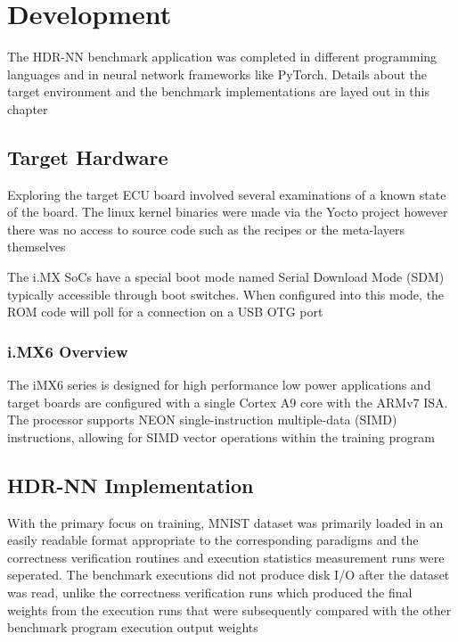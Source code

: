 
\chapter{Development}

The HDR-NN benchmark application was completed in different programming languages and in neural network frameworks like PyTorch. Details about the target environment and the benchmark implementations are layed out in this chapter

\section[iMX6 Custom Board Target]{Target Hardware}

Exploring the target ECU board involved several examinations of a known state of the board. The linux kernel binaries were made via the Yocto project however there was no access to source code such as the recipes or the meta-layers themselves

The i.MX SoCs have a special boot mode named Serial Download Mode (SDM) typically accessible through boot switches. When configured into this mode, the ROM code will poll for a connection on a USB OTG port

\subsection[ECU / iMX6 Evaluation Board Overview]{i.MX6 Overview}

The iMX6 series is designed for high performance low power applications and target boards are configured with a single Cortex A9 core with the ARMv7 ISA. The processor supports NEON single-instruction multiple-data (SIMD) instructions, allowing for SIMD vector operations within the training program

\section{HDR-NN Implementation}

With the primary focus on training, MNIST dataset was primarily loaded in an easily readable format appropriate to the corresponding paradigms and the correctness verification routines and execution statistics measurement runs were seperated. The benchmark executions did not produce disk I/O after the dataset was read, unlike the correctness verification runs which produced the final weights from the execution runs that were subsequently compared with the other benchmark program execution output weights

